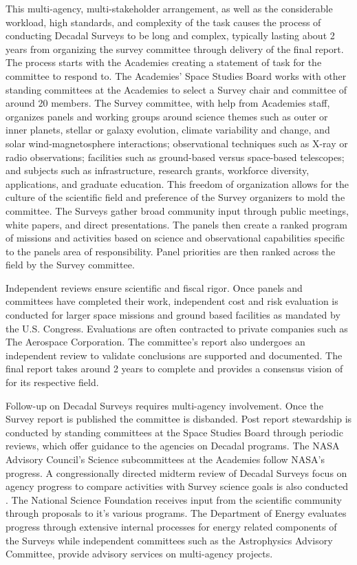 \documentclass[preprint,12pt,doubleblind]{elsarticle}
\begin{document}
This multi-agency, multi-stakeholder arrangement, as well as the considerable workload, high standards, and complexity of the task causes the process of conducting Decadal Surveys to be long and complex, typically lasting about 2 years from organizing the survey committee through delivery of the final report. The process starts with the Academies creating a statement of task for the committee to respond to. The Academies' Space Studies Board works with other standing committees at the Academies to select a Survey chair and committee of around 20 members. The Survey committee, with help from Academies staff, organizes panels and working groups around science themes such as outer or inner planets, stellar or galaxy evolution, climate variability and change, and solar wind-magnetosphere interactions; observational techniques such as X-ray or radio observations; facilities such as ground-based versus space-based telescopes; and subjects such as infrastructure, research grants, workforce diversity, applications, and graduate education. This freedom of organization allows for the culture of the scientific field and preference of the Survey organizers to mold the committee. The Surveys gather broad community input through public meetings, white papers, and direct presentations. The panels then create a ranked program of missions and activities based on science and observational capabilities specific to the panels area of responsibility. Panel priorities are then ranked across the field by the Survey committee. 

Independent reviews ensure scientific and fiscal rigor. Once panels and committees have completed their work, independent cost and risk evaluation is conducted for larger space missions and ground based facilities as mandated by the U.S. Congress. Evaluations are often contracted to private companies such as The Aerospace Corporation\cite{congress2008NASA}. The committee's report also undergoes an independent review to validate conclusions are supported and documented. The final report takes around 2 years to complete and provides a consensus vision of for its respective field.

Follow-up on Decadal Surveys requires multi-agency involvement. Once the Survey report is published the committee is disbanded. Post report stewardship is conducted by standing committees at the Space Studies Board through periodic reviews, which offer guidance to the agencies on Decadal programs. The NASA Advisory Council's Science subcommittees at the Academies follow NASA's progress. A congressionally directed midterm review of Decadal Surveys focus on agency progress to compare activities with Survey science goals is also conducted \cite{congress2005nasa}. The National Science Foundation receives input from the scientific community through proposals to it's various programs. The Department of Energy evaluates progress through extensive internal processes for energy related components of the Surveys while independent committees such as the Astrophysics Advisory Committee, provide advisory services on multi-agency projects.
\end{document}
